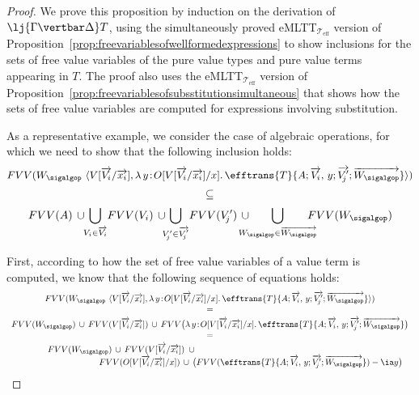 \begin{proof}
We prove this proposition by induction on the derivation of $\lj {\Gamma \vertbar \Delta} T$, using the simultaneously proved eMLTT$_{\mathcal{T}_{\text{eff}}}$ version of Proposition~\ref{prop:freevariablesofwellformedexpressions} to show inclusions for the sets of free value variables of the pure value types and pure value terms appearing in $T$. The proof also uses the eMLTT$_{\mathcal{T}_{\text{eff}}}$ version of Proposition~\ref{prop:freevariablesofsubsstitutionsimultaneous} that shows how the sets of free value variables are computed for expressions involving substitution. 

As a representative example, we consider the case of algebraic operations, for which we need to show that the following inclusion holds:
\[
FVV(W_{\sigalgop}\,\, \langle V[\overrightarrow{V_i}/\overrightarrow{x_i}] , \lambda\, y \!:\! O[V[\overrightarrow{V_i}/\overrightarrow{x_i}]/x] .\, \efftrans {T} {A; \overrightarrow{V_i},\, y; \overrightarrow{V'_{\!j}}; \overrightarrow{W_{\sigalgop}}}\rangle)
\vspace{-0.3cm}
\]
\[
\subseteq
\vspace{-0.1cm}
\]
\[
FVV(A) \,\cup\!\! \bigcup_{V_i \in \overrightarrow{V_i}} \! FVV(V_i) \,\cup\!\!\! \bigcup_{V'_{\!j} \in \overrightarrow{V'_{\!j}}} \! FVV(V'_{\!j}) \,\cup\!\!\!\!\!\!\! \bigcup_{W_{\sigalgop} \in \overrightarrow{W_{\sigalgop}}} \!\!\!\!\!\! FVV(W_{\sigalgop}) 
\]
%

First, according to how the set of free value variables of a value term is computed, we know that the following sequence of equations holds:
\[
\begin{array}{c}
FVV(W_{\sigalgop}\,\, \langle V[\overrightarrow{V_i}/\overrightarrow{x_i}] , \lambda\, y \!:\! O[V[\overrightarrow{V_i}/\overrightarrow{x_i}]/x] .\, \efftrans {T} {A; \overrightarrow{V_i} ,\, y; \overrightarrow{V'_{\!j}}; \overrightarrow{W_{\sigalgop}}}\rangle)
\\
=
\\[1mm]
FVV(W_{\sigalgop}) \,\cup\, FVV(V[\overrightarrow{V_i}/\overrightarrow{x_i}]) \,\cup\, FVV\big(\lambda\, y \!:\! O[V[\overrightarrow{V_i}/\overrightarrow{x_i}]/x] .\, \efftrans {T} {A; \overrightarrow{V_i},\, y; \overrightarrow{V'_{\!j}}; \overrightarrow{W_{\sigalgop}}}\big)
\\
=
\\[1mm]
\hspace{-7.225cm}
FVV(W_{\sigalgop}) \,\cup\, FVV(V[\overrightarrow{V_i}/\overrightarrow{x_i}]) \,\,\,\cup\, 
\\
\hspace{3.35cm}
FVV(O[V[\overrightarrow{V_i}/\overrightarrow{x_i}]/x]) \,\cup\, \big(FVV(\efftrans {T} {A; \overrightarrow{V_i} ,\, y; \overrightarrow{V'_{\!j}}; \overrightarrow{W_{\sigalgop}}}) - \ia y \big)
\end{array}
\]
%


\end{proof}
